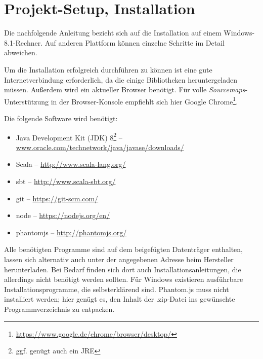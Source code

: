 \documentclass[a4paper, 12pt, listof=totoc, bibliography=totoc]{scrreprt}
\begin{document}
\chapter{Projekt-Setup, Installation}


Die nachfolgende Anleitung bezieht sich auf die Installation auf einem Windows-8.1-Rechner. Auf anderen Plattform können einzelne Schritte im Detail abweichen.

Um die Installation erfolgreich durchführen zu können ist eine gute Internetverbindung erforderlich, da die einige Bibliotheken heruntergeladen müssen. Außerdem wird ein aktueller Browser benötigt. Für volle \textit{Sourcemaps}-Unterstützung in der Browser-Konsole empfiehlt sich hier Google Chrome\footnote{\url{https://www.google.de/chrome/browser/desktop/}}.

Die folgende Software wird benötigt:

\begin{itemize}
	\item Java Development Kit (JDK) 8\footnote{ggf. genügt auch ein JRE}  --  \url{www.oracle.com/technetwork/java/javase/downloads/}
	\item Scala  --  \url{http://www.scala-lang.org/}
	\item sbt  --  \url{http://www.scala-sbt.org/}
	\item git  --  \url{https://git-scm.com/}
	\item node  --  \url{https://nodejs.org/en/}
	\item phantomjs  --  \url{http://phantomjs.org/}
\end{itemize}

Alle benötigten Programme sind auf dem beigefügten Datenträger enthalten, lassen sich alternativ auch unter der angegebenen Adresse beim Hersteller herunterladen. Bei Bedarf finden sich dort auch Installationsanleitungen, die allerdings nicht benötigt werden sollten. Für Windows existieren ausführbare Installationsprogramme, die selbsterklärend sind. Phantom.js muss nicht installiert werden; hier genügt es, den Inhalt der .zip-Datei ins gewünschte Programmverzeichnis zu entpacken.
\end{document}
